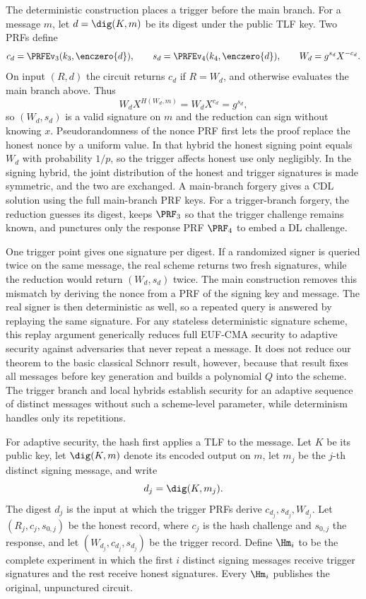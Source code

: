  The deterministic construction places a trigger before the main branch. For a message $m$, let $d=\dig(K,m)$ be its digest under the public TLF key. Two PRFs define
$$
c_d=\PRFEv_3(k_3,\enczero{d}),
\qquad
s_d=\PRFEv_4(k_4,\enczero{d}),
\qquad
W_d=g^{s_d}X^{-c_d}.
$$
On input $(R,d)$ the circuit returns $c_d$ if $R=W_d$, and otherwise evaluates the main branch above. Thus
$$
W_d X^{H(W_d,m)}=W_dX^{c_d}=g^{s_d},
$$
so $(W_d,s_d)$ is a valid signature on $m$ and the reduction can sign without knowing $x$. Pseudorandomness of the nonce PRF first lets the proof replace the honest nonce by a uniform value. In that hybrid the honest signing point equals $W_d$ with probability $1/p$, so the trigger affects honest use only negligibly. In the signing hybrid, the joint distribution of the honest and trigger signatures is made symmetric, and the two are exchanged. A main-branch forgery gives a CDL solution using the full main-branch PRF keys. For a trigger-branch forgery, the reduction guesses its digest, keeps $\PRF_3$ so that the trigger challenge remains known, and punctures only the response PRF $\PRF_4$ to embed a DL challenge.

 One trigger point gives one signature per digest. If a randomized signer is queried twice on the same message, the real scheme returns two fresh signatures, while the reduction would return $(W_d,s_d)$ twice. The main construction removes this mismatch by deriving the nonce from a PRF of the signing key and message. The real signer is then deterministic as well, so a repeated query is answered by replaying the same signature. For any stateless deterministic signature scheme, this replay argument generically reduces full EUF-CMA security to adaptive security against adversaries that never repeat a message. It does not reduce our theorem to the basic classical Schnorr result, however, because that result fixes all messages before key generation and builds a polynomial $Q$ into the scheme. The trigger branch and local hybrids establish security for an adaptive sequence of distinct messages without such a scheme-level parameter, while determinism handles only its repetitions.

 For adaptive security, the hash first applies a TLF to the message. Let $K$ be its public key, let $\dig(K,m)$ denote its encoded output on $m$, let $m_j$ be the $j$-th distinct signing message, and write
$$
d_j=\dig(K,m_j).
$$
The digest $d_j$ is the input at which the trigger PRFs derive $c_{d_j},s_{d_j},W_{d_j}$. Let $(R_j,c_j,s_{0,j})$ be the honest record, where $c_j$ is the hash challenge and $s_{0,j}$ the response, and let $(W_{d_j},c_{d_j},s_{d_j})$ be the trigger record. Define $\Hm_i$ to be the complete experiment in which the first $i$ distinct signing messages receive trigger signatures and the rest receive honest signatures. Every $\Hm_i$ publishes the original, unpunctured circuit.

